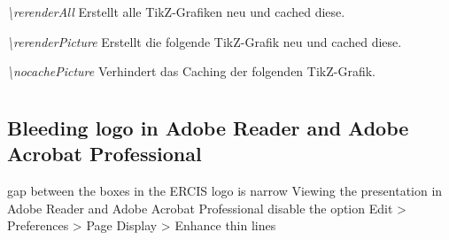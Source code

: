 \documentclass[a4paper,11pt]{article}
\begin{document}

\emph{\textbackslash rerenderAll} Erstellt alle TikZ-Grafiken neu und cached diese.

\emph{\textbackslash rerenderPicture} Erstellt die folgende TikZ-Grafik neu und cached diese.

\emph{\textbackslash nocachePicture} Verhindert das Caching der folgenden TikZ-Grafik.

\providecommand{\rerenderPicture}{%
  \tikzset{external/remake next=true}%
}









\section{}

\subsection{Bleeding logo in Adobe Reader and Adobe Acrobat Professional}

gap between the boxes in the ERCIS logo is narrow
Viewing the presentation in Adobe Reader and Adobe Acrobat Professional
disable the option Edit > Preferences > Page Display > Enhance thin lines
\end{document}
